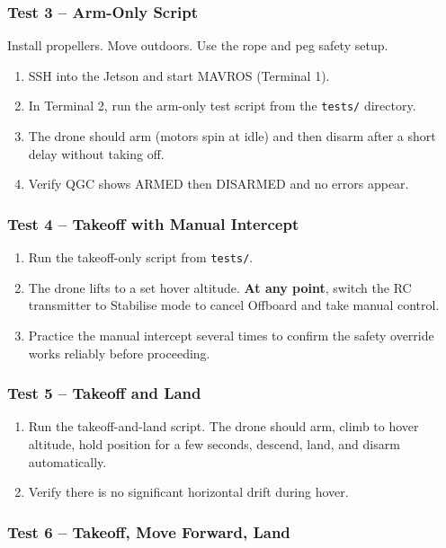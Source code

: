 \documentclass{article}
\begin{document}
\subsubsection{Test 3 -- Arm-Only Script}

Install propellers. Move outdoors. Use the rope and peg safety setup.

\begin{enumerate}
    \item SSH into the Jetson and start MAVROS (Terminal 1).
    \item In Terminal 2, run the arm-only test script from the \texttt{tests/} directory.
    \item The drone should arm (motors spin at idle) and then disarm after a short delay without taking off.
    \item Verify QGC shows ARMED then DISARMED and no errors appear.
\end{enumerate}

\subsubsection{Test 4 -- Takeoff with Manual Intercept}

\begin{enumerate}
    \item Run the takeoff-only script from \texttt{tests/}.
    \item The drone lifts to a set hover altitude. \textbf{At any point}, switch the RC transmitter to Stabilise mode to cancel Offboard and take manual control.
    \item Practice the manual intercept several times to confirm the safety override works reliably before proceeding.
\end{enumerate}

\subsubsection{Test 5 -- Takeoff and Land}

\begin{enumerate}
    \item Run the takeoff-and-land script. The drone should arm, climb to hover altitude, hold position for a few seconds, descend, land, and disarm automatically.
    \item Verify there is no significant horizontal drift during hover.
\end{enumerate}

\subsubsection{Test 6 -- Takeoff, Move Forward, Land}
\end{document}
